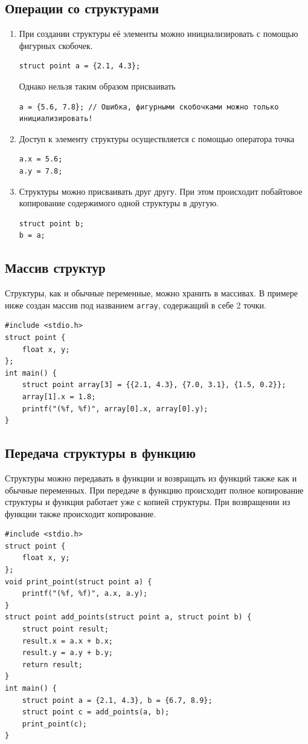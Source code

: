 \documentclass{article}
\begin{document}
\subsection*{Операции со структурами}
\begin{enumerate}
\item При создании структуры её элементы можно инициализировать с помощью фигурных скобочек.
\begin{lstlisting}
struct point a = {2.1, 4.3};
\end{lstlisting}
Однако нельзя таким образом присваивать
\begin{lstlisting}
a = {5.6, 7.8}; // Ошибка, фигурными скобочками можно только инициализировать!
\end{lstlisting}
\item Доступ к элементу структуры осуществляется с помощью оператора точка
\begin{lstlisting}
a.x = 5.6;
a.y = 7.8;
\end{lstlisting}
\item Структуры можно присваивать друг другу. При этом происходит побайтовое копирование содержимого одной структуры в другую.
\begin{lstlisting}
struct point b;
b = a;
\end{lstlisting}
\end{enumerate}

\subsection*{Массив структур}
Структуры, как и обычные переменные, можно хранить в массивах. В примере ниже создан массив под названием \texttt{array}, содержащий в себе 2 точки.
\begin{lstlisting}
#include <stdio.h>
struct point {
    float x, y;
};
int main() {
    struct point array[3] = {{2.1, 4.3}, {7.0, 3.1}, {1.5, 0.2}};
    array[1].x = 1.8;
    printf("(%f, %f)", array[0].x, array[0].y);
}
\end{lstlisting}

\subsection*{Передача структуры в функцию}
Структуры можно передавать в функции и возвращать из функций также как и обычные переменных. При передаче в функцию происходит полное копирование структуры и функция работает уже с копией структуры. При возвращении из функции также происходит копирование.
\begin{lstlisting}
#include <stdio.h>
struct point {
    float x, y;
};
void print_point(struct point a) {
    printf("(%f, %f)", a.x, a.y);
}
struct point add_points(struct point a, struct point b) {
    struct point result;
    result.x = a.x + b.x;
    result.y = a.y + b.y;
    return result;
}
int main() {
    struct point a = {2.1, 4.3}, b = {6.7, 8.9};
    struct point c = add_points(a, b);
    print_point(c);
}
\end{lstlisting}
\vspace*{-\baselineskip}
\end{document}
